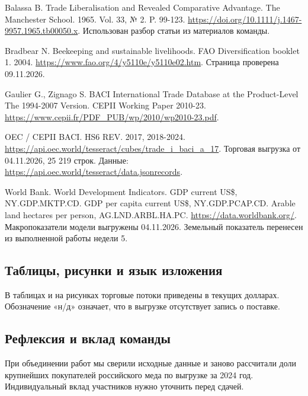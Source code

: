 \documentclass[12pt,a4paper]{article}
\begin{document}
\noindent [2] Balassa B. Trade Liberalisation and Revealed Comparative Advantage. The Manchester School. 1965. Vol. 33, № 2. P. 99-123. \url{https://doi.org/10.1111/j.1467-9957.1965.tb00050.x}. Использован разбор статьи из материалов команды.

\noindent [3] Bradbear N. Beekeeping and sustainable livelihoods. FAO Diversification booklet 1. 2004. \url{https://www.fao.org/4/y5110e/y5110e02.htm}. Страница проверена 09.11.2026.

\noindent [4] Gaulier G., Zignago S. BACI International Trade Database at the Product-Level The 1994-2007 Version. CEPII Working Paper 2010-23. \url{https://www.cepii.fr/PDF_PUB/wp/2010/wp2010-23.pdf}. 

\noindent [5] OEC / CEPII BACI. HS6 REV. 2017, 2018-2024. \url{https://api.oec.world/tesseract/cubes/trade_i_baci_a_17}. Торговая выгрузка от 04.11.2026, 25 219 строк. Данные: \url{https://api.oec.world/tesseract/data.jsonrecords}.

\noindent [6] World Bank. World Development Indicators. GDP current US\$, NY.GDP.MKTP.CD. GDP per capita current US\$, NY.GDP.PCAP.CD. Arable land hectares per person, AG.LND.ARBL.HA.PC. \url{https://data.worldbank.org/}. Макропоказатели модели выгружены 04.11.2026. Земельный показатель перенесен из выполненной работы недели 5.

\subsection{Таблицы, рисунки и язык изложения}
В таблицах и на рисунках торговые потоки приведены в текущих долларах. Обозначение «н/д» означает, что в выгрузке отсутствует запись о поставке.

\subsection{Рефлексия и вклад команды}
При объединении работ мы сверили исходные данные и заново рассчитали доли крупнейших покупателей российского меда по выгрузке за 2024 год. Индивидуальный вклад участников нужно уточнить перед сдачей.
\end{document}

